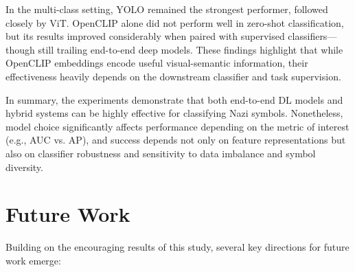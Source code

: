 In the multi-class setting, \ac{YOLO} remained the strongest performer, followed closely by \ac{ViT}. OpenCLIP alone did
not perform well in zero-shot classification, but its results improved considerably when paired with supervised
classifiers—though still trailing end-to-end deep models. These findings highlight that while OpenCLIP embeddings
encode useful visual-semantic information, their effectiveness heavily depends on the downstream classifier and task
supervision.

In summary, the experiments demonstrate that both end-to-end \ac{DL} models and hybrid systems can be highly
effective for classifying Nazi symbols. Nonetheless, model choice significantly affects performance depending on the
metric of interest (e.g., \ac{AUC} vs. \ac{AP}), and success depends not only on feature representations but also on
classifier robustness and sensitivity to data imbalance and symbol diversity.

\section{Future Work}

Building on the encouraging results of this study, several key directions for future work emerge:

